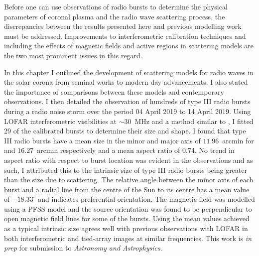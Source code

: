 Before one can use observations of radio bursts to determine the physical parameters of coronal plasma and the radio wave scattering process, the discrepancies between the results presented here and previous modelling work must be addressed. Improvements to interferometric calibration techniques and including the effects of magnetic fields and active regions in scattering models are the two most prominent issues in this regard. %

In this chapter I outlined the development of scattering models for radio waves in the solar corona from seminal works to modern day advancements. I also stated the importance of comparisons between these models and contemporary observations. I then detailed the observation of hundreds of type III radio bursts during a radio noise storm over the period 04 April 2019 to 14 April 2019. Using LOFAR interferometric visibilities at $\sim 30$~MHz and a method similar to \cite{Murphy2021}, I fitted 29 of the calibrated bursts to determine their size and shape. I found that type III radio bursts have a mean size in the minor and major axis of $11.96$~arcmin for and $16.27$~arcmin respectively and a mean aspect ratio of 0.74. No trend in aspect ratio with respect to burst location was evident in the observations and as such, I attributed this to the intrinsic size of type III radio bursts being greater than the size due to scattering. The relative angle between the minor axis of each burst and a radial line from the centre of the Sun to its centre has a mean value of $-18.33^\circ$ and indicates preferential orientation. The magnetic field was modelled using a PFSS model and the source orientation was found to be perpendicular to open magnetic field lines for some of the bursts. Using the mean values achieved as a typical intrinsic size agrees well with previous observations with LOFAR in both interferometric and tied-array images at similar frequencies. This work is \textit{in prep} for submission to \textit{Astronomy and Astrophysics}.
